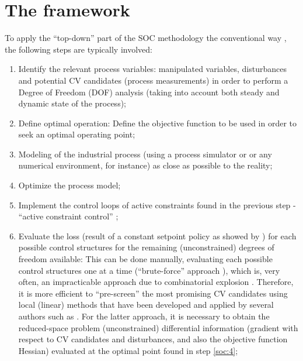 \documentclass[../msc-thesis.tex]{subfiles}
\begin{document}
\chapter{The \mtc framework}

To apply the ``top-down'' part \cite{Skogestad2000} of the SOC methodology the 
conventional way \cite{Alves2018, Alstad2009, Skogestad2000}, the following 
steps are typically involved:

\begin{enumerate}
    \item Identify the relevant process variables: manipulated variables, 
    disturbances and potential CV candidates (process measurements) in order 
    to perform a Degree of Freedom (DOF) analysis (taking into account both 
    steady and dynamic state of the process); \label{soc:1}

    \item Define optimal operation: Define the objective function to be used 
    in order to seek an optimal operating point; \label{soc:2}

    \item Modeling of the industrial process (using a process simulator or or 
    any numerical environment, for instance) as close as possible to the 
    reality; \label{soc:3}

    \item Optimize the process model; \label{soc:4}
    
    \item Implement the control loops of active constraints found in the 
    previous step - ``active constraint control'' \cite{Skogestad2000}; 
    \label{soc:5}
    
    \item Evaluate the loss (result of a constant setpoint policy as showed 
    by \textcite{Skogestad2000,Halvorsen2003}) for each possible control 
    structures for the remaining (unconstrained) degrees of freedom available: 
    This can be done manually, evaluating each possible control structures 
    one at a time (``brute-force'' approach \cite{Umar2012}), which is, very 
    often, an impracticable approach due to combinatorial explosion 
    \cite{Araujo2007}. Therefore, it is more efficient to ``pre-screen'' the 
    most promising CV candidates using local (linear) methods that have 
    been developed and applied by several authors such as 
    \textcite{Halvorsen2003,Hori2005,Hori2008,Alstad2009}. For the latter 
    approach, it is necessary to obtain the reduced-space problem 
    (unconstrained) differential information (gradient with respect to CV 
    candidates and disturbances, and also the objective function Hessian) 
    evaluated at the optimal point found in step \ref{soc:4}; \label{soc:6}


\end{enumerate}
\end{document}

